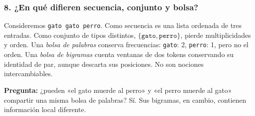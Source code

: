 \subsubsection*{8. ¿En qué difieren secuencia, conjunto y bolsa?}
Consideremos \texttt{gato gato perro}. Como secuencia es una lista ordenada de tres entradas. Como conjunto de tipos distintos, $\{\texttt{gato},\texttt{perro}\}$, pierde multiplicidades y orden. Una \emph{bolsa de palabras} conserva frecuencias: \texttt{gato}: 2, \texttt{perro}: 1, pero no el orden. Una \emph{bolsa de bigramas} cuenta ventanas de dos tokens conservando su identidad de par, aunque descarta sus posiciones. No son nociones intercambiables.
\begin{center}
\end{center}
\noindent\textbf{Pregunta:} ¿pueden «el gato muerde al perro» y «el perro muerde al gato» compartir una misma bolsa de palabras? Sí. Sus bigramas, en cambio, contienen información local diferente.


